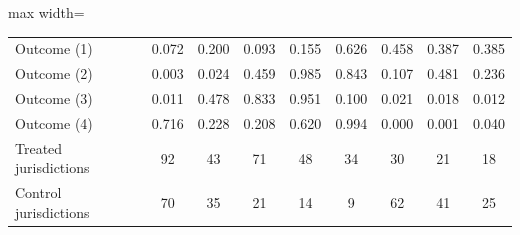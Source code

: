 \begin{adjustbox}{max width=\textwidth}
\begin{tabular}{l*{8}{c}}
\hspace{.4cm} Outcome (1) & 0.072 & 0.200 & 0.093 & 0.155 & 0.626 & 0.458 & 0.387 & 0.385 \\
\hspace{.4cm} Outcome (2) & 0.003 & 0.024 & 0.459 & 0.985 & 0.843 & 0.107 & 0.481 & 0.236 \\
\hspace{.4cm} Outcome (3) & 0.011 & 0.478 & 0.833 & 0.951 & 0.100 & 0.021 & 0.018 & 0.012 \\
\hspace{.4cm} Outcome (4) & 0.716 & 0.228 & 0.208 & 0.620 & 0.994 & 0.000 & 0.001 & 0.040 \\
\midrule
Treated jurisdictions & 92 & 43 & 71 & 48 & 34 & 30 & 21 & 18 \\
Control jurisdictions & 70 & 35 & 21 & 14 & 9 & 62 & 41 & 25 \\
\bottomrule
\end{tabular}
\end{adjustbox}
